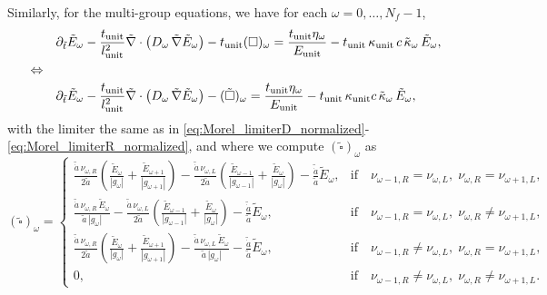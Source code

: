 \documentclass[10pt]{article}
\renewcommand{\(}{\left(}
\renewcommand{\)}{\right)}
\newcommand{\adot}{\dot{a}}
\newcommand{\Lunit}{l_{\text{unit}}}
\newcommand{\Tunit}{t_{\text{unit}}}
\newcommand{\Eunit}{E_{\text{unit}}}
\newcommand{\Kunit}{\kappa_{\text{unit}}}
\newcommand{\tK}{\tilde{\kappa}}
\newcommand{\tT}{\tilde{t}}
\newcommand{\tE}{\tilde{E}}
\newcommand{\tA}{\tilde{a}}
\newcommand{\tAdot}{\tilde{\adot}}
\newcommand{\tnabla}{\tilde{\nabla}}
\begin{document}
Similarly, for the multi-group equations, we have for each $\omega=0,\ldots,N_f-1$,
\begin{align}
  \notag
  &\partial_{\tT} \tE_{\omega} - \frac{\Tunit}{\Lunit^2}\tnabla\cdot\(D_{\omega}\,\tnabla \tE_{\omega}\)
    - \Tunit(\square)_{\omega} = \frac{\Tunit\eta_{\omega}}{\Eunit} 
    - \Tunit\, \Kunit\, c\, \tK_{\omega}\, \tE_{\omega},\\
  \Leftrightarrow \quad & \\
  \label{eq:mgfld_multigroup_comoving_normalized}
  &\partial_{\tT} \tE_{\omega} - \frac{\Tunit}{\Lunit^2}\tnabla\cdot\(D_{\omega}\,\tnabla \tE_{\omega}\)
    - (\tilde{\square})_{\omega} = \frac{\Tunit\eta_{\omega}}{\Eunit} 
    - \Tunit\, \Kunit c\, \tK_{\omega}\, \tE_{\omega},
\end{align}
with the limiter the same as in
\eqref{eq:Morel_limiterD_normalized}-\eqref{eq:Morel_limiterR_normalized},
and where we compute $(\tilde{\square})_{\omega}$ as
\begin{equation}
\label{eq:square_omega_normalized}
  (\tilde{\square})_{\omega} = \begin{cases}
     \frac{\tAdot\, \nu_{\omega,R}}{2\tA}\left(\frac{\tE_{\omega}}{|g_{\omega}|} + \frac{\tE_{\omega+1}}{|g_{\omega+1}|}\right) -
      \frac{\tAdot\, \nu_{\omega,L}}{2\tA}\left(\frac{\tE_{\omega-1}}{|g_{\omega-1}|}+\frac{\tE_{\omega}}{|g_{\omega}|}\right) -
      \frac{\tAdot}{\tA}\tE_{\omega},&
      \text{if}\quad \nu_{\omega-1,R}=\nu_{\omega,L},\; \nu_{\omega,R}=\nu_{\omega+1,L},\\
     \frac{\tAdot\, \nu_{\omega,R}\, \tE_{\omega}}{\tA\, |g_{\omega}|} -
      \frac{\tAdot\, \nu_{\omega,L}}{2\tA}\left(\frac{\tE_{\omega-1}}{|g_{\omega-1}|}+\frac{\tE_{\omega}}{|g_{\omega}|}\right) -
      \frac{\tAdot}{\tA}\tE_{\omega},&
      \text{if}\quad \nu_{\omega-1,R}=\nu_{\omega,L},\; \nu_{\omega,R}\ne\nu_{\omega+1,L},\\
     \frac{\tAdot\, \nu_{\omega,R}}{2\tA}\left(\frac{\tE_{\omega}}{|g_{\omega}|} + \frac{\tE_{\omega+1}}{|g_{\omega+1}|}\right) -
      \frac{\tAdot\, \nu_{\omega,L}\, \tE_{\omega}}{\tA\, |g_{\omega}|} -
      \frac{\tAdot}{\tA}\tE_{\omega},&
      \text{if}\quad \nu_{\omega-1,R}\ne\nu_{\omega,L},\; \nu_{\omega,R}=\nu_{\omega+1,L},\\
     0,& \text{if}\quad \nu_{\omega-1,R}\ne\nu_{\omega,L},\; \nu_{\omega,R}\ne\nu_{\omega+1,L}.
  \end{cases}
\end{equation}
\end{document}
